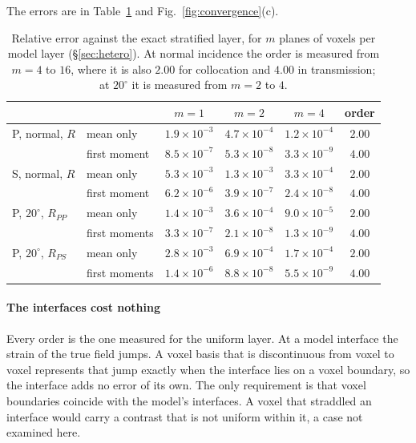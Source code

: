 \documentclass[preprint,review,12pt]{elsarticle}
\begin{document}
The errors are in Table~\ref{tab:hetero} and Fig.~\ref{fig:convergence}(c).
\begin{table}[htbp]
\centering
\caption{Relative error against the exact stratified layer, for $m$ planes of voxels per model layer (\S\ref{sec:hetero}). At normal incidence the order is measured from $m=4$ to $16$, where it is also $2.00$ for collocation and $4.00$ in transmission; at $20^\circ$ it is measured from $m=2$ to $4$.}\label{tab:hetero}
\small
\begin{tabular}{@{}llcccc@{}}
\toprule
 & & $m=1$ & $m=2$ & $m=4$ & order \\
\midrule
P, normal, $R$ & mean only & $1.9\times10^{-3}$ & $4.7\times10^{-4}$ & $1.2\times10^{-4}$ & $2.00$ \\
 & first moment & $8.5\times10^{-7}$ & $5.3\times10^{-8}$ & $3.3\times10^{-9}$ & $4.00$ \\
S, normal, $R$ & mean only & $5.3\times10^{-3}$ & $1.3\times10^{-3}$ & $3.3\times10^{-4}$ & $2.00$ \\
 & first moment & $6.2\times10^{-6}$ & $3.9\times10^{-7}$ & $2.4\times10^{-8}$ & $4.00$ \\
P, $20^\circ$, $R_{PP}$ & mean only & $1.4\times10^{-3}$ & $3.6\times10^{-4}$ & $9.0\times10^{-5}$ & $2.00$ \\
 & first moments & $3.3\times10^{-7}$ & $2.1\times10^{-8}$ & $1.3\times10^{-9}$ & $4.00$ \\
P, $20^\circ$, $R_{PS}$ & mean only & $2.8\times10^{-3}$ & $6.9\times10^{-4}$ & $1.7\times10^{-4}$ & $2.00$ \\
 & first moments & $1.4\times10^{-6}$ & $8.8\times10^{-8}$ & $5.5\times10^{-9}$ & $4.00$ \\
\bottomrule
\end{tabular}
\end{table}

\paragraph{The interfaces cost nothing} Every order is the one measured for the uniform layer. At a
model interface the strain of the true field jumps. A voxel basis that is discontinuous from voxel
to voxel represents that jump exactly when the interface lies on a voxel boundary, so the interface
adds no error of its own. The only requirement is that voxel boundaries coincide with the model's interfaces. A voxel
that straddled an interface would carry a contrast that is not uniform within it, a case not
examined here.
\end{document}
